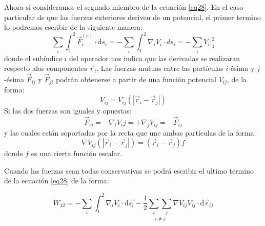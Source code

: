 \documentclass[../main]{subfiles}
\begin{document}
Ahora si consideramos el segundo miembro de la ecuación \eqref{eq28}. En el caso particular de que las fuerzas exteriores deriven de un potencial, el primer termino lo podremos escribir de la siguiente manera:
\begin{equation*}
    \sum_i \int_1^2 \vec{F}_i^{(e)} \cdot \text{d} s_i= -\sum_i \int_1^2 \nabla_i V_i \cdot ds_i= - \sum_i V_i |_1^2
\end{equation*}
donde el subíndice $i$ del operador nos indica que las derivadas se realizaran respecto alas componentes $\vec{r}_i$. Las fuerzas mutuas entre las partículas $i$-ésima y $j$-ésima $\vec{F}_{ij}$ y $\vec{F}_{ji}$ podrán obtenerse a partir de una función potencial $V_{ij}$, de la forma:
\begin{equation}
    V_{ij}=V_{ij} (|\vec{r}_i-\vec{r}_j|)
    \label{eq31}
\end{equation}
Si las dos fuerzas son iguales y opuestas:
\begin{equation}
    \vec{F}_{ij}=-\nabla_i V_ij=+\nabla_j V_{ij}=-\vec{F}_{ij}
    \label{eq32}
\end{equation}
y las cuales están soportadas por la recta que une ambas partículas de la forma:
\begin{equation}
    \nabla V_{ij} (|\vec{r}_i-\vec{r}_j|)=(\vec{r}_i-\vec{r}_j) f
    \label{eq33}
\end{equation}
donde $f$ es una cierta función escalar.

\vspace{0.2cm}
Cuando las fuerzas sean todas conservativas se podrá escribir el ultimo termino de la ecuación \eqref{eq28} de la forma:

\begin{equation}
    W_{12}=-\sum_i \int_1^2 \nabla_i V_i \cdot \text{d} \vec{s_i}-\dfrac{1}{2} \underset{i \neq j}{\sum_i \sum_j} \nabla V_{ij} V_{ij} \cdot \text{d} \vec{r}_{ij}
    \label{eq34}
\end{equation}
\end{document}
